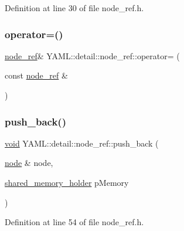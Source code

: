 Definition at line 30 of file node\+\_\+ref.\+h.

\mbox{\label{class_y_a_m_l_1_1detail_1_1node__ref_ada3f5b5bc9ee4b26a0fbafdeac0a9da9}} 
\subsubsection{\texorpdfstring{operator=()}{operator=()}}
{\footnotesize\ttfamily \mbox{\hyperlink{class_y_a_m_l_1_1detail_1_1node__ref}{node\+\_\+ref}}\& Y\+A\+M\+L\+::detail\+::node\+\_\+ref\+::operator= (\begin{DoxyParamCaption}\item[{const \mbox{\hyperlink{class_y_a_m_l_1_1detail_1_1node__ref}{node\+\_\+ref}} \&}]{ }\end{DoxyParamCaption})\hspace{0.3cm}{\ttfamily [delete]}}

\mbox{\label{class_y_a_m_l_1_1detail_1_1node__ref_a0b6cf1208301571efc2a28726a9f2215}} 
\subsubsection{\texorpdfstring{push\_back()}{push\_back()}}
{\footnotesize\ttfamily \mbox{\hyperlink{glad_8h_a950fc91edb4504f62f1c577bf4727c29}{void}} Y\+A\+M\+L\+::detail\+::node\+\_\+ref\+::push\+\_\+back (\begin{DoxyParamCaption}\item[{\mbox{\hyperlink{class_y_a_m_l_1_1detail_1_1node}{node}} \&}]{node,  }\item[{\mbox{\hyperlink{namespace_y_a_m_l_1_1detail_a228c4b3b6ba1058b474d40afc218e21d}{shared\+\_\+memory\+\_\+holder}}}]{p\+Memory }\end{DoxyParamCaption})\hspace{0.3cm}{\ttfamily [inline]}}



Definition at line 54 of file node\+\_\+ref.\+h.

\mbox{\label{class_y_a_m_l_1_1detail_1_1node__ref_a02a59cbb7cef49ffa2c2b4f2ec52e7a7}} 
